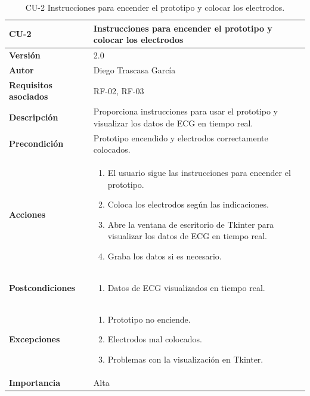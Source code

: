 \begin{table}[p]
	\centering
	\begin{tabularx}{\linewidth}{ p{} p{} }
		\toprule
		\textbf{CU-2}    & \textbf{Instrucciones para encender el prototipo y colocar los electrodos}\\
		\toprule
		\textbf{Versión}              & 2.0    \\
		\textbf{Autor}                & Diego Trascasa García \\
		\textbf{Requisitos asociados} & RF-02, RF-03 \\
		\textbf{Descripción}          & Proporciona instrucciones para usar el prototipo y visualizar los datos de ECG en tiempo real. \\
		\textbf{Precondición}         & Prototipo encendido y electrodos correctamente colocados. \\
		\textbf{Acciones}             &
		\begin{enumerate}
			\item El usuario sigue las instrucciones para encender el prototipo.
			\item Coloca los electrodos según las indicaciones.
			\item Abre la ventana de escritorio de Tkinter para visualizar los datos de ECG en tiempo real.
			\item Graba los datos si es necesario.
		\end{enumerate}\\
		\textbf{Postcondiciones}      & 
		\begin{enumerate}
			\item Datos de ECG visualizados en tiempo real.
		\end{enumerate}\\
		\textbf{Excepciones}          & 
		\begin{enumerate}
			\item Prototipo no enciende.
			\item Electrodos mal colocados.
			\item Problemas con la visualización en Tkinter.
		\end{enumerate}\\
		\textbf{Importancia}          & Alta \\
		\bottomrule
	\end{tabularx}
	\caption{CU-2 Instrucciones para encender el prototipo y colocar los electrodos.}
    \label{CU-2}
\end{table}

